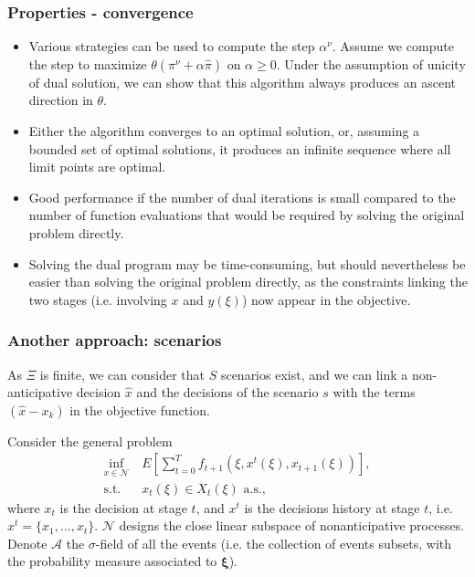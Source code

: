 \documentclass[french]{beamer}
\def\bxi{\boldsymbol\xi}
\begin{document}
\begin{frame}
\frametitle{Properties - convergence}

\begin{itemize}
\item
Various strategies can be used to compute the step $\alpha^\nu$. Assume we compute the step to maximize $\theta(\pi^{\nu}+\alpha\hat{\pi})$ on $\alpha \geq 0$.
Under the assumption of unicity of dual solution, we can show that this algorithm always produces an {\blue ascent direction} in $\theta$.
\item
Either the algorithm converges to an optimal solution, or, assuming a bounded set of optimal solutions, it produces an infinite sequence where all limit points are optimal.
\item
Good performance if the number of dual iterations is small compared to the number of function evaluations that would be required by solving the original problem directly.
\item
Solving the dual program may be time-consuming, but should nevertheless be easier than solving the original problem directly, as the constraints linking the two stages (i.e. involving $x$ and $y(\xi)$) now appear in the objective.
\end{itemize}

\end{frame}

\begin{frame}

\frametitle{Another approach: scenarios}

As $\Xi$ is finite, we can consider that $S$ scenarios exist, and we can link a non-anticipative decision $\hat{x}$ and the decisions of the scenario $s$ with the terms $(\hat{x}-x_k)$ in the objective function.

\mbox{}

Consider the general problem
\begin{align*}
\inf_{x \in \mathcal{N}}\ & E \left[ \sum_{t=0}^T f_{t+1}(\xi, x^t(\xi),
x_{t+1}(\xi)) \right], \\
\mbox{s.t. } & x_t(\xi) \in X_t(\xi) \mbox{ a.s.},
\end{align*}
where $x_t$ is the decision at stage $t$, and $x^t$ is the decisions history at stage $t$, i.e. $x^t = \lbrace x_1,\ldots, x_t \rbrace$.
$\mathcal{N}$ designs the close linear subspace of nonanticipative processes.
Denote $\mathcal{A}$ the $\sigma$-field of all the events (i.e. the collection of events subsets, with the probability measure associated to $\bxi$).

\end{frame}
\end{document}
